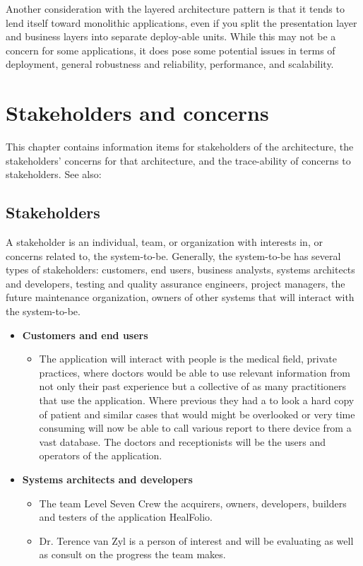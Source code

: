 \documentclass[10pt,oneside]{report}
\begin{document}
Another consideration with the layered architecture pattern is that it tends to lend itself toward monolithic applications, even if you split the presentation layer and business layers into separate deploy-able units. While this may not be a concern for some applications, it does pose some potential issues in terms of deployment, general robustness and reliability, performance, and scalability.


\chapter{Stakeholders and concerns}\label{sec:snc}

This chapter contains information items for stakeholders of the 
architecture, the stakeholders' concerns for that architecture, and
the trace-ability of concerns to stakeholders. See also:~

\section{Stakeholders}\label{ad:stakeholders}

A stakeholder is an individual, team, or organization with interests in, or concerns related to, the system-to-be. Generally, the system-to-be has several types of stakeholders: customers, end users, business analysts, systems architects and developers, testing and quality assurance engineers, project managers, the future maintenance organization, owners of other systems that will interact with the system-to-be.
 
 \begin{itemize}

\item \textbf{Customers and end users}
\begin{itemize}
\item The application will interact with people is the medical field, private practices, where doctors would be able to use relevant information from not only their past experience but a collective of as many practitioners that use the application. Where previous they had a to look a hard copy of patient and similar cases that would might be overlooked or very time consuming will now be able to call various report to there device from a vast database. The doctors and receptionists will be the users and operators of the application.
\end{itemize}
\item \textbf{Systems architects and developers}
\begin{itemize}
\item The team Level Seven Crew the acquirers, owners, developers, builders and testers of the application HealFolio. 
\item Dr. Terence van Zyl is a person of interest and will be evaluating as well as consult on the progress the team makes.
\end{itemize}
\end{itemize}
\end{document}
